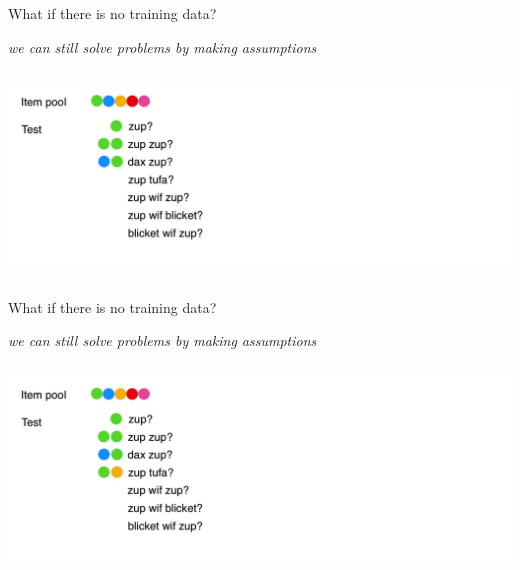\begin{frame}{What if there is no training data?}
\centerline{\textit{we can still solve problems by making assumptions}}
\centering\includegraphics[height=5.5cm]{image/img191531.jpg}

\end{frame}

\begin{frame}{What if there is no training data?}
\centerline{\textit{we can still solve problems by making assumptions}}
\centering\includegraphics[height=5.5cm]{image/img192202.jpg}

\end{frame}

